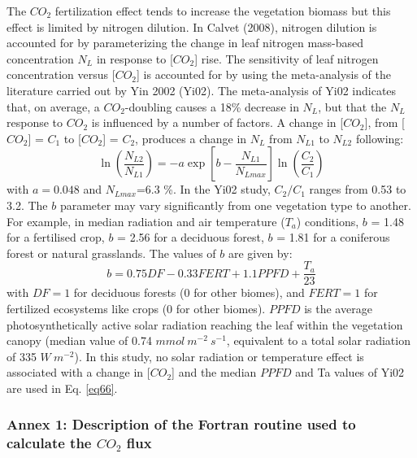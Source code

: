 {The $CO_{2}$ fertilization effect tends to increase the vegetation biomass but this effect is limited by
nitrogen dilution. In Calvet \etal (2008), nitrogen dilution is accounted for by parameterizing the change
in leaf nitrogen mass-based concentration $N_{L}$ in response to [$CO_{2}$] rise. The sensitivity of leaf nitrogen
concentration versus [$CO_{2}$] is accounted for by using the meta-analysis of the literature carried out by
Yin 2002 (Yi02). The meta-analysis of Yi02 indicates that, on average, a $CO_{2}$-doubling causes a 18\%
decrease in $N_{L}$, but that the $N_{L}$ response to $CO_{2}$ is influenced by a number of factors. A change in
[$CO_{2}$], from [$CO_{2}$] = $C_{1}$ to [$CO_{2}$] = $C_{2}$, produces a change in $N_{L}$ from $N_{L1}$ to $N_{L2}$ following:
%
\begin{equation}
\ln \left (  \frac{N_{L2}}{N_{L1}}     \right ) = -a \exp \left [
  b-\frac{N_{L1}}{N_{Lmax}}    \right ] \ln \left (
  \frac{C_{2}}{C_{1}}    \right )
%
\end{equation}
%
with $a=0.048$ and $N_{Lmax}$=6.3 \%. In the Yi02 study, $C_{2}/C_{1}$ ranges from 0.53 to 3.2. The $b$ parameter may
vary significantly from one vegetation type to another. For example, in median radiation and air
temperature ($T_a$) conditions, $b$ = 1.48 for a fertilised crop, $b$ = 2.56 for a deciduous forest, $b$ = 1.81 for
a coniferous forest or natural grasslands.
The values of $b$ are given by:
%
\begin{equation}\label{eq66}
b = 0.75DF-0.33FERT+1.1PPFD+\frac{T_{a}}{23}
\end{equation}
%
with $DF=1$ for deciduous forests (0 for other biomes), and $FERT=1$ for fertilized ecosystems like crops
(0 for other biomes). $PPFD$ is the average photosynthetically active solar radiation reaching the leaf
within the vegetation canopy (median value of 0.74 $mmol ~m^{-2} ~s^{-1}$, equivalent to a total solar radiation
of 335 $W ~m^{-2}$). In this study, no solar radiation or temperature effect is associated with a change in
[$CO_{2}$] and the median $PPFD$ and Ta values of Yi02 are used in Eq. \ref{eq66}.

\subsubsection{Annex 1: Description of the Fortran routine used to calculate the $CO_{2}$ flux}

}

